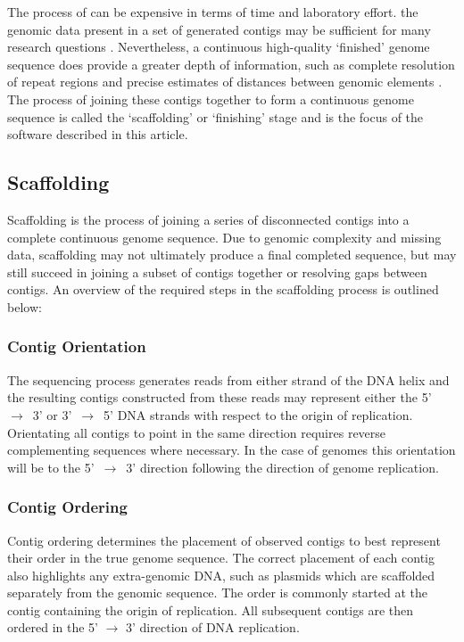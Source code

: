 \documentclass[10pt]{bmc_article}
\newenvironment{bmcformat}{\begin{raggedright}\baselineskip20pt\sloppy\setboolean{publ}{false}}{\end{raggedright}\baselineskip20pt\sloppy}
\begin{document}
\begin{bmcformat}
The process of  can be expensive in terms of time and
laboratory effort.  the genomic data present in
a set of generated contigs may be sufficient for many research questions
\cite{branscomb2002}. Nevertheless, a continuous high-quality `finished' genome
sequence does provide a greater depth of information, such as complete
resolution of repeat regions and precise estimates of distances between genomic
elements \cite{parkhill2002,fraser2002}. The process of joining these contigs
together to form a continuous genome sequence is called the `scaffolding' or
`finishing' stage and is the focus of the software described in this article.
\pb

\subsection*{Scaffolding} %

Scaffolding is the process of joining a series of disconnected contigs into
a complete continuous genome sequence. Due to genomic complexity and missing
data, scaffolding may not ultimately produce a final completed sequence, but
may still succeed in joining a subset of contigs together or resolving gaps
between contigs. An overview of the required steps in the scaffolding process
is outlined below:

\subsubsection*{Contig Orientation} %

The sequencing process generates reads from either strand of the DNA helix and
the resulting contigs constructed from these reads may represent either the
5'~$\rightarrow$~3' or 3'~$\rightarrow$~5' DNA strands with respect to the
origin of replication. Orientating all contigs to point in the same direction
requires reverse complementing sequences where necessary. In the case of
 genomes this orientation will be to
the 5'~$\rightarrow$~3' direction following the direction of genome
replication.

\subsubsection*{Contig Ordering} %

Contig ordering determines the placement of observed contigs to best represent
their order in the true genome sequence. The correct placement of each contig
also highlights any extra-genomic DNA, such as plasmids which are scaffolded
separately from the genomic sequence. The order is commonly started at the
contig containing the origin of replication. All subsequent contigs are then
ordered in the 5' $\rightarrow$ 3' direction of DNA replication.


\end{bmcformat}
\end{document}
